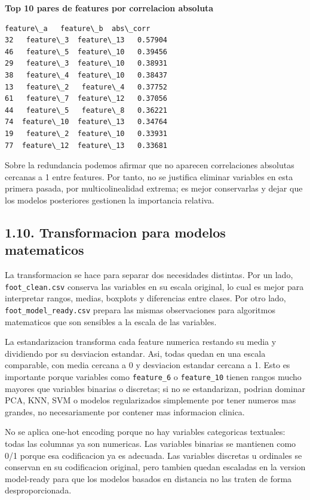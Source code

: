\documentclass[11pt]{article}
\begin{document}
    
    \textbf{Top 10 pares de features por correlacion absoluta}

    
    
    \begin{Verbatim}[commandchars=\\\{\}]
     feature\_a   feature\_b  abs\_corr
32   feature\_3  feature\_13   0.57904
46   feature\_5  feature\_10   0.39456
29   feature\_3  feature\_10   0.38931
38   feature\_4  feature\_10   0.38437
13   feature\_2   feature\_4   0.37752
61   feature\_7  feature\_12   0.37056
44   feature\_5   feature\_8   0.36221
74  feature\_10  feature\_13   0.34764
19   feature\_2  feature\_10   0.33931
77  feature\_12  feature\_13   0.33681
    \end{Verbatim}

    
    Sobre la redundancia podemos afirmar que no aparecen correlaciones
absolutas cercanas a 1 entre features. Por tanto, no se justifica
eliminar variables en esta primera pasada, por multicolinealidad
extrema; es mejor conservarlas y dejar que los modelos posteriores
gestionen la importancia relativa.

    \subsection{1.10. Transformacion para modelos
matematicos}\label{transformacion-para-modelos-matematicos}

La transformacion se hace para separar dos necesidades distintas. Por un
lado, \texttt{foot\_clean.csv} conserva las variables en su escala
original, lo cual es mejor para interpretar rangos, medias, boxplots y
diferencias entre clases. Por otro lado, \texttt{foot\_model\_ready.csv}
prepara las mismas observaciones para algoritmos matematicos que son
sensibles a la escala de las variables.

La estandarizacion transforma cada feature numerica restando su media y
dividiendo por su desviacion estandar. Asi, todas quedan en una escala
comparable, con media cercana a 0 y desviacion estandar cercana a 1.
Esto es importante porque variables como \texttt{feature\_6} o
\texttt{feature\_10} tienen rangos mucho mayores que variables binarias
o discretas; si no se estandarizan, podrian dominar PCA, KNN, SVM o
modelos regularizados simplemente por tener numeros mas grandes, no
necesariamente por contener mas informacion clinica.

No se aplica one-hot encoding porque no hay variables categoricas
textuales: todas las columnas ya son numericas. Las variables binarias
se mantienen como 0/1 porque esa codificacion ya es adecuada. Las
variables discretas u ordinales se conservan en su codificacion
original, pero tambien quedan escaladas en la version model-ready para
que los modelos basados en distancia no las traten de forma
desproporcionada.
\end{document}

